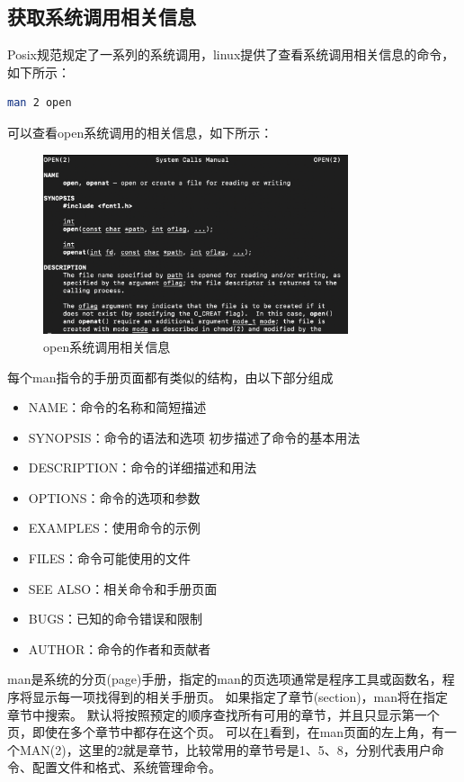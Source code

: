 \subsection{获取系统调用相关信息}
Posix规范规定了一系列的系统调用，linux提供了查看系统调用相关信息的命令，如下所示：
\begin{lstlisting}[language=bash]
    man 2 open 
\end{lstlisting}
可以查看open系统调用的相关信息，如下所示：
\begin{figure}[H]
  \centering
  \includegraphics[width=0.8\textwidth]{figures/09-03-open系统调用manu信息.png}
  \caption{open系统调用相关信息}
  \label{fig:opensyscall}
\end{figure}
每个man指令的手册页面都有类似的结构，由以下部分组成
\begin{itemize}
    \item NAME：命令的名称和简短描述
    \item SYNOPSIS：命令的语法和选项 初步描述了命令的基本用法
    \item DESCRIPTION：命令的详细描述和用法
    \item OPTIONS：命令的选项和参数
    \item EXAMPLES：使用命令的示例
    \item FILES：命令可能使用的文件
    \item SEE ALSO：相关命令和手册页面
    \item BUGS：已知的命令错误和限制
    \item AUTHOR：命令的作者和贡献者
\end{itemize}
man是系统的分页(page)手册，指定的man的页选项通常是程序工具或函数名，程序将显示每一项找得到的相关手册页。
如果指定了章节(section)，man将在指定章节中搜索。
默认将按照预定的顺序查找所有可用的章节，并且只显示第一个页，即使在多个章节中都存在这个页。
可以在\ref{fig:opensyscall}看到，在man页面的左上角，有一个MAN(2)，这里的2就是章节，比较常用的章节号是1、5、8，分别代表用户命令、配置文件和格式、系统管理命令。

